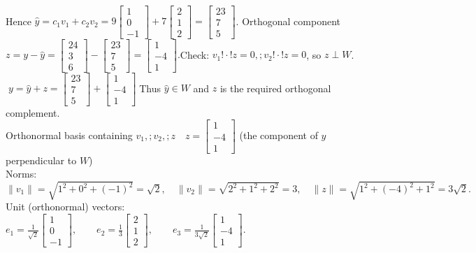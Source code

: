 \documentclass{article}
\begin{document}
\begin{multicols*}{2}
\\Hence $\hat y=c_1v_1+c_2v_2=9\!\begin{bmatrix}1\\0\\-1\end{bmatrix}+7\!\begin{bmatrix}2\\1\\2\end{bmatrix}=\begin{bmatrix}23\\7\\5\end{bmatrix}$. Orthogonal component$z=y-\hat y=\begin{bmatrix}24\\3\\6\end{bmatrix}-\begin{bmatrix}23\\7\\5\end{bmatrix}=\begin{bmatrix}1\\-4\\1\end{bmatrix}.$Check: $v_1!\cdot! z=0,; v_2!\cdot! z=0$, so $z\perp W$.$\boxed{\;y=\hat y+z=\begin{bmatrix}23\\7\\5\end{bmatrix}+\begin{bmatrix}1\\-4\\1\end{bmatrix}\;}$Thus $\hat y\in W$ and $z$ is the required orthogonal complement.
\\Orthonormal basis containing $v_1,;v_2,;z \quad z=\begin{bmatrix}1\\-4\\1\end{bmatrix}$ (the component of $y$ perpendicular to $W$)
\\Norms: $\lVert v_1\rVert=\sqrt{1^{2}+0^{2}+(-1)^{2}}=\sqrt{2},\quad\lVert v_2\rVert=\sqrt{2^{2}+1^{2}+2^{2}}=3,\quad\lVert z\rVert=\sqrt{1^{2}+(-4)^{2}+1^{2}}=3\sqrt{2}.$
\\Unit (orthonormal) vectors: $e_1=\frac{1}{\sqrt{2}}\begin{bmatrix}1\\0\\-1\end{bmatrix},\qquad e_2=\frac{1}{3}\begin{bmatrix}2\\1\\2\end{bmatrix},\qquad e_3=\frac{1}{3\sqrt{2}}\begin{bmatrix}1\\-4\\1\end{bmatrix}.$

\end{multicols*}
\end{document}
